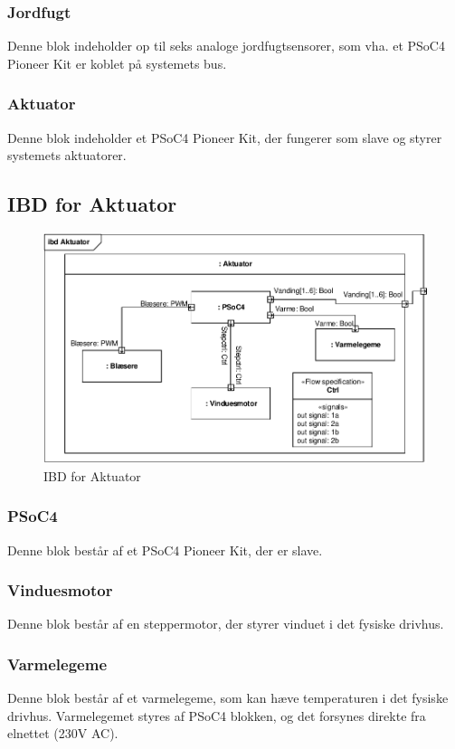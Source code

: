 \subsubsection{Jordfugt}
Denne blok indeholder op til seks analoge jordfugtsensorer, som vha. et PSoC4 Pioneer Kit er koblet på systemets \IIC bus.
\subsubsection{Aktuator}
Denne blok indeholder et PSoC4 Pioneer Kit, der fungerer som \IIC slave og styrer systemets aktuatorer. 

\subsection{IBD for Aktuator}

\begin{figure}[h]
\centering 
\includegraphics[width={\textwidth}, trim=0 0 0 0, clip=true] {../fig/ibd_aktuator.pdf}
\caption{IBD for Aktuator}
\label{fig:ibd_aktuator}
\end{figure}

\subsubsection{PSoC4}
Denne blok består af et PSoC4 Pioneer Kit, der er \IIC slave. 
\subsubsection{Vinduesmotor}
Denne blok består af en steppermotor, der styrer vinduet i det fysiske drivhus.
\subsubsection{Varmelegeme}
Denne blok består af et varmelegeme, som kan hæve temperaturen i det fysiske drivhus. Varmelegemet styres af PSoC4 blokken, og det forsynes direkte fra elnettet (230V AC). 
